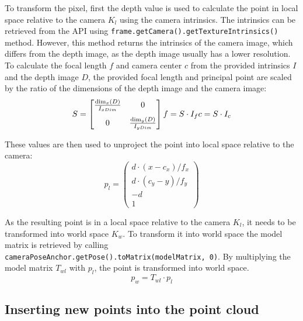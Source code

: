 To transform the pixel, first the depth value is used to calculate the point in local space relative to the camera $K_l$ using the camera intrinsics.
The intrinsics can be retrieved from the API using \texttt{frame.getCamera().getTextureIntrinsics()} method.
However, this method returns the intrinsics of the camera image, which differs from the depth image, as the depth image usually has a lower resolution.
To calculate the focal length $f$ and camera center $c$ from the provided intrinsics $I$ and the depth image $D$,
the provided focal length and principal point are scaled by the ratio of the dimensions of the depth image and the camera image:
\begin{equation}
    S = \begin{bmatrix}
            \frac{\dim_x(D)}{I_{xDim}} & 0\\[8pt]
            0                          & \frac{\dim_y(D)}{I_{yDim}}
    \end{bmatrix}\\
    f = S \cdot I_f \\
    c = S \cdot I_c
\end{equation}

These values are then used to unproject the point into local space relative to the camera:
\begin{equation}
    p_l = \begin{pmatrix}
              d \cdot (x - c_x) / f_x \\
              d \cdot (c_y - y) / f_y \\
              -d                      \\
              1
    \end{pmatrix}
\end{equation}

As the resulting point is in a local space relative to the camera $K_l$, it needs to be transformed into world space $K_w$.
To transform it into world space the model matrix is retrieved by calling
\texttt{cameraPoseAnchor.getPose().toMatrix(modelMatrix, 0)}.
By multiplying the model matrix $T_{wl}$ with $p_l$, the point is transformed into world space.
\begin{equation}
    p_w = T_{wl} \cdot p_l
\end{equation}

\cite{google_llc_codelab_raw_depth, google_llc_arcore_doc}

\subsection{Inserting new points into the point cloud}

